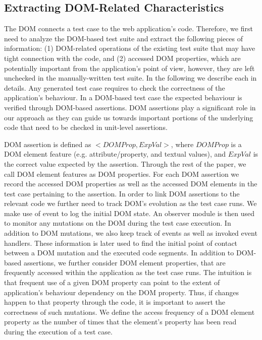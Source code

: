 \subsection{Extracting DOM-Related Characteristics} \label{Sec:extractDomRelatedInfo}
The DOM connects a test case to the web application's \javascript code. Therefore, we first need to analyze the DOM-based test suite and extract the following pieces of information: (1) DOM-related operations of the existing test suite that may have tight connection with the \javascript code, and (2) accessed DOM properties, which are potentially important from the application's point of view, however, they are left unchecked in the manually-written test suite. In the following we describe each in details.
Any generated test case requires to check the correctness of the application's behaviour. In a DOM-based test case the expected behaviour is verified through DOM-based assertions. 
DOM assertions play a significant role in our approach as they can guide us towards important portions of the underlying \javascript code that need to be checked in unit-level assertions.

DOM assertion is defined as $<DOMProp,ExpVal>$, where $DOMProp$ is a DOM element feature (e.g. attribute/property, and textual values), and $ExpVal$ is the correct value expected by the assertion. Through the rest of the paper, we call DOM element features as DOM properties.
For each DOM assertion we record the accessed DOM properties as well as the accessed DOM elements in the test case pertaining to the assertion. In order to link DOM assertions to the relevant \javascript code we further need to track DOM's evolution as the test case runs. We make use of  event to log the initial DOM state. An observer module is then used to monitor any mutations on the DOM during the test case execution. In addition to DOM mutations, we also keep track of \javascript events as well as invoked event handlers. These information is later used to find the initial point of contact between a DOM mutation and the executed code segments. 
In addition to DOM-based assertions, we further consider DOM element properties, that are frequently accessed within the application as the test case runs. The intuition is that frequent use of a given DOM property can point to the extent of application's behaviour dependency on the DOM property. Thus, if changes happen to that property through the \javascript code, it is important to assert the correctness of such mutations. We define the access frequency of a DOM element property as the number of times that the element's property has been read during the execution of a test case.       

